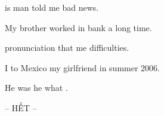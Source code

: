 \documentclass[11pt]{article}
\begin{document}
\begin{vnmultiplechoice}[title={\bf  Câu hỏi gạch dưới},  keycolumns=3]
\begin{question}
 is  man  told me  bad news.
\datcot
\bonpah
{}
{} 
{} 
{}
\end{question}


\begin{question}
 My  brother  worked in  bank  a long time.
\datcot
\bonpah
{}
{}
{}
{}
\end{question}

\begin{question}
  pronunciation that  me  difficulties.
\datcot
\bonpah
{} 
{}
{} 
{}
\end{question}

\begin{question}
 I  to Mexico  my girlfriend in  summer  2006.
\datcot
\bonpah
{}
{}
{}
{}
\end{question}

\begin{question}
He was   he  what .
\datcot
\bonpah
{} 
{}
{} 
{}
\end{question}

\begin{examclosing}
\centerline{-- HẾT --}
\end{examclosing}
\end{vnmultiplechoice}
\end{document}
